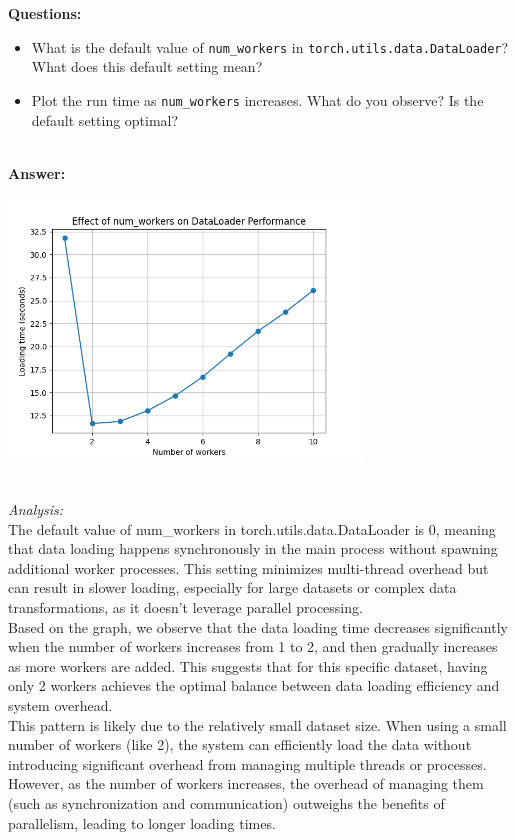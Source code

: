 \documentclass[11pt, oneside]{article}   	%
\begin{document}
\textbf{Questions:}
\begin{itemize}
    \item What is the default value of \texttt{num\_workers} in \texttt{torch.utils.data.DataLoader}? What does this default setting mean?
    \item Plot the run time as \texttt{num\_workers} increases. What do you observe? Is the default setting optimal?
\end{itemize}
\\
\textbf{Answer:}
\begin{center}
    \includegraphics[width=0.7\textwidth]{graphs/Figure_1.png}
\end{center}
\\
\textit{Analysis: }
\\
The default value of num\_workers in torch.utils.data.DataLoader is 0, meaning that data loading happens synchronously in the main process without spawning additional worker processes. This setting minimizes multi-thread overhead but can result in slower loading, especially for large datasets or complex data transformations, as it doesn't leverage parallel processing.
\\
Based on the graph, we observe that the data loading time decreases significantly when the number of workers increases from 1 to 2, and then gradually increases as more workers are added. This suggests that for this specific dataset, having only 2 workers achieves the optimal balance between data loading efficiency and system overhead.
\\
This pattern is likely due to the relatively small dataset size. When using a small number of workers (like 2), the system can efficiently load the data without introducing significant overhead from managing multiple threads or processes. However, as the number of workers increases, the overhead of managing them (such as synchronization and communication) outweighs the benefits of parallelism, leading to longer loading times.
\end{document}

